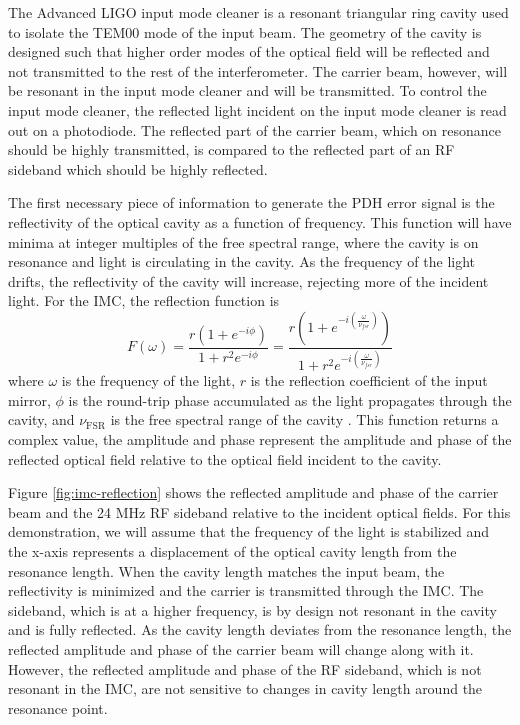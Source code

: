The Advanced LIGO input mode cleaner is a resonant triangular ring cavity used to isolate 
the TEM00 mode of the input beam. The geometry of the cavity is designed such that 
higher order modes of the optical field will be reflected and not transmitted to 
the rest of the interferometer. The carrier beam, however, will be resonant in 
the input mode cleaner and will be transmitted. To control the input mode cleaner, 
the reflected 
light incident on the input mode cleaner is read out on a photodiode. The reflected 
part of the carrier beam, which on resonance should be highly transmitted, 
is compared to the reflected part of an RF sideband which should be highly 
reflected.

The first necessary piece of information to generate the PDH error signal is 
the reflectivity of the optical cavity as a function of frequency. This function 
will have minima at integer multiples of the free spectral range, where the 
cavity is on resonance and light is circulating in the cavity. As the frequency 
of the light drifts, the reflectivity of the cavity will increase, rejecting more 
of the incident light. For the IMC, 
the reflection function is 
\begin{equation}
F(\omega) = \frac{r(1 + e^{-i\phi})}{1+r^2e^{-i\phi}} = \frac{r(1 + e^{-i(\frac{\omega}{\nu_{fsr}})})}{1+r^2e^{-i(\frac{\omega}{\nu_{fsr}})}}
\end{equation}
where $\omega$ is the frequency of the light, $r$ is the reflection coefficient 
of the input mirror, $\phi$ is the round-trip phase 
accumulated as the light propagates through the cavity, 
and $\nu_{\mathrm{FSR}}$ is the free spectral range of the cavity \cite{Mueller}.
This function returns a complex value, the amplitude and phase represent the 
amplitude and phase of the reflected optical field relative to the 
optical field incident to the cavity.

Figure \ref{fig:imc-reflection} shows the reflected amplitude and phase of 
the carrier beam and the 24 MHz RF sideband relative to the incident optical 
fields. For this demonstration, 
we will assume that the frequency of the light is stabilized and the 
x-axis represents a displacement of the optical cavity length from the resonance length. 
When the cavity length matches the input beam, the reflectivity is minimized and the 
carrier is transmitted through the IMC. The sideband, which is at a higher frequency, 
is by design not resonant in the cavity and is fully reflected.
As the cavity length deviates from the resonance length, the reflected amplitude and 
phase of the carrier 
beam will change along with it. However, the reflected amplitude and phase of the 
RF sideband, which is not resonant in the IMC, are not sensitive to changes in 
cavity length around the resonance point.


